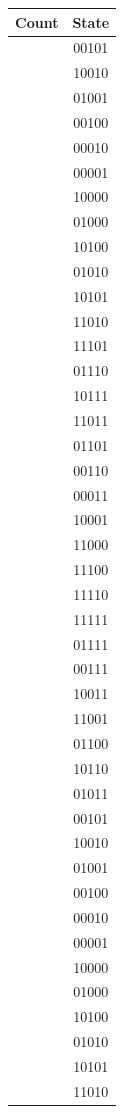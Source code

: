 \documentclass{article}
\begin{document}
\begin{center}
\begin{tabular}{c|c}
Count & State \\ \hline
[56] & 00101 \\ \hline
[57] & 10010 \\ \hline
[58] & 01001 \\ \hline
[59] & 00100 \\ \hline
[60] & 00010 \\ \hline
[61] & 00001 \\ \hline
[62] & 10000 \\ \hline
[63] & 01000 \\ \hline
[64] & 10100 \\ \hline
[65] & 01010 \\ \hline
[66] & 10101 \\ \hline
[67] & 11010 \\ \hline
[68] & 11101 \\ \hline
[69] & 01110 \\ \hline
[70] & 10111 \\ \hline
[71] & 11011 \\ \hline
[72] & 01101 \\ \hline
[73] & 00110 \\ \hline
[74] & 00011 \\ \hline
[75] & 10001 \\ \hline
[76] & 11000 \\ \hline
[77] & 11100 \\ \hline
[78] & 11110 \\ \hline
[79] & 11111 \\ \hline
[80] & 01111 \\ \hline
[81] & 00111 \\ \hline
[82] & 10011 \\ \hline
[83] & 11001 \\ \hline
[84] & 01100 \\ \hline
[85] & 10110 \\ \hline
[86] & 01011 \\ \hline
[87] & 00101 \\ \hline
[88] & 10010 \\ \hline
[90] & 01001 \\ \hline
[91] & 00100 \\ \hline
[92] & 00010 \\ \hline
[93] & 00001 \\ \hline
[94] & 10000 \\ \hline
[95] & 01000 \\ \hline
[96] & 10100 \\ \hline
[97] & 01010 \\ \hline
[98] & 10101 \\ \hline
[99] & 11010 \\ \hline

\end{tabular}
\end{center}
\end{document}
